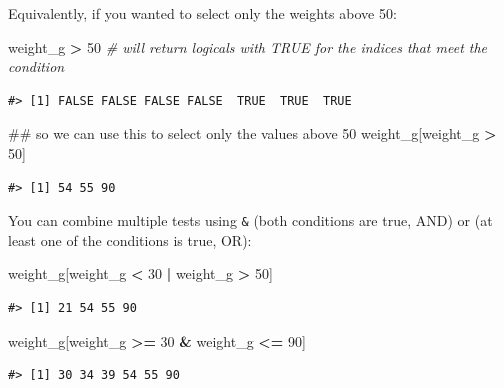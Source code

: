 \documentclass[]{book}
\newenvironment{Shaded}{\begin{snugshade}}{\end{snugshade}}
\newcommand{\DecValTok}[1]{\textcolor[rgb]{0.00,0.00,0.81}{#1}}
\newcommand{\StringTok}[1]{\textcolor[rgb]{0.31,0.60,0.02}{#1}}
\newcommand{\CommentTok}[1]{\textcolor[rgb]{0.56,0.35,0.01}{\textit{#1}}}
\newcommand{\OperatorTok}[1]{\textcolor[rgb]{0.81,0.36,0.00}{\textbf{#1}}}
\newcommand{\NormalTok}[1]{#1}
\begin{document}
Equivalently, if you wanted to select only the weights above 50:

\begin{Shaded}
\begin{Highlighting}[]
\NormalTok{weight_g }\OperatorTok{>}\StringTok{ }\DecValTok{50}    \CommentTok{# will return logicals with TRUE for the indices that meet the condition}
\end{Highlighting}
\end{Shaded}

\begin{verbatim}
#> [1] FALSE FALSE FALSE FALSE  TRUE  TRUE  TRUE
\end{verbatim}

\begin{Shaded}
\begin{Highlighting}[]
\NormalTok{## so we can use this to select only the values above 50}
\NormalTok{weight_g[weight_g }\OperatorTok{>}\StringTok{ }\DecValTok{50}\NormalTok{]}
\end{Highlighting}
\end{Shaded}

\begin{verbatim}
#> [1] 54 55 90
\end{verbatim}

You can combine multiple tests using \texttt{\&} (both conditions are
true, AND) or \texttt{\textbar{}} (at least one of the conditions is
true, OR):

\begin{Shaded}
\begin{Highlighting}[]
\NormalTok{weight_g[weight_g }\OperatorTok{<}\StringTok{ }\DecValTok{30} \OperatorTok{|}\StringTok{ }\NormalTok{weight_g }\OperatorTok{>}\StringTok{ }\DecValTok{50}\NormalTok{]}
\end{Highlighting}
\end{Shaded}

\begin{verbatim}
#> [1] 21 54 55 90
\end{verbatim}

\begin{Shaded}
\begin{Highlighting}[]
\NormalTok{weight_g[weight_g }\OperatorTok{>=}\StringTok{ }\DecValTok{30} \OperatorTok{&}\StringTok{ }\NormalTok{weight_g }\OperatorTok{<=}\StringTok{ }\DecValTok{90}\NormalTok{]}
\end{Highlighting}
\end{Shaded}

\begin{verbatim}
#> [1] 30 34 39 54 55 90
\end{verbatim}
\end{document}

